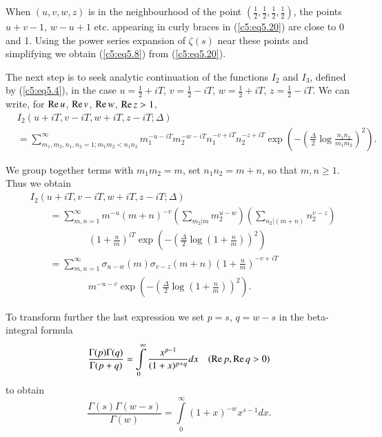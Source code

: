 When $(u,v,w,z)$ is in the neighbourhood of the point $
\left(\frac{1}{2}, \frac{1}{2}, \frac{1}{2}, \frac{1}{2} \right)$, the
points $u+v-1$, $w-u+1$ etc. appearing in curly braces in
(\ref{c5:eq5.20}) are close to 0 and 1. Using the power series
expansion of $\zeta(s)$ near these points and simplifying we obtain
(\ref{c5:eq5.8}) from (\ref{c5:eq5.20}). 

The next step is to seek analytic continuation of the functions $I_2$
and $I_3$, defined by  (\ref{c5:eq5.4}), in the case $u=\frac{1}{2} +
iT$, $v = \frac{1}{2} - iT$, $w = \frac{1}{2} + iT$, $z = \frac{1}{2}
- iT$. We can write, for $\operatorname{Re} u$, $\operatorname{Re} v$, $\operatorname{Re} w$, $\operatorname{Re} z >1$, 
{\fontsize{10pt}{12pt}\selectfont
\begin{align*}
& I_2 (u+iT, v - iT, w + iT, z- iT; \Delta)\\
& = \sum\limits^{\infty}_{m_1, m_2, n_1, n_2 =1; m_1 m_2 < n_1 n_2}
m_1^{-u-iT} m^{-w-iT}_2 n_1^{-v+iT} n_2^{-z+iT}
 \exp \left( -\left(\frac{\Delta}{2} \log \frac{n_1 n_2}{m_1 m_2}
\right)^2\right).   
\end{align*}}

We group together terms with $m_1m_2 = m$, set $n_1 n_2 = m+n$, so
that $m,n \geq 1$. Thus we obtain 
\begin{align*}
& I_2 (u+iT, v - iT, w + iT, z - iT; \Delta)\\
& \qquad = \sum\limits^\infty_{m,n=1} m^{-u} (m+n)^{-v} \left(\sum\limits_{m_2|m} m^{u-w}_2 \right) \left(\sum\limits_{n_2|(m+n)} n^{v-z}_2 \right) \\
& \qquad \qquad  \qquad  \left(1+\frac{n}{m} \right)^{iT} \exp \left(- \left(\frac{\Delta}{2} \log \left(1+ \frac{n}{m} \right) \right)^2 \right)\\
& \qquad = \sum\limits^\infty_{m,n=1} \sigma_{u-w} (m) \sigma_{v-z} (m+n) \left(1+\frac{n}{m} \right)^{-v+iT}\\
& \qquad \qquad \qquad   m^{-u-v} \exp \left(- \left(\frac{\Delta}{2} \log \left(1+ \frac{n}{m} \right) \right)^2 \right).
\end{align*}\pageoriginale

To transform further the last expression we set $p=s$, $q=w-s$ in the
beta-integral formula 
$$
\frac{\Gamma(p) \Gamma(q)}{\Gamma(p+q)} = \int\limits^\infty_0
\frac{x^{p-1}}{(1+x)^{p+q}} dx \quad (\operatorname{Re} p, \operatorname{Re} q > 0) 
$$
to obtain
$$
\frac{\Gamma (s) \Gamma (w-s)}{\Gamma(w)} = \int\limits^{\infty}_0
(1+x)^{-w} x^{s-1} dx. 
$$


